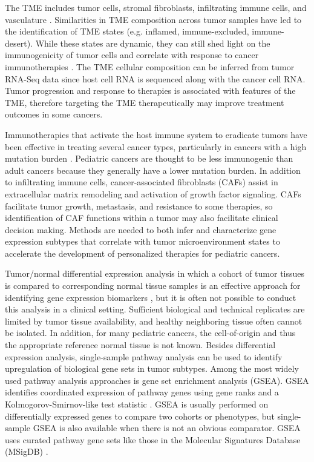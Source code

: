 \documentclass[10pt,letterpaper]{article}
\begin{document}
The TME includes tumor cells, stromal fibroblasts, infiltrating immune cells, and vasculature \cite{joyceCellExclusionImmune2015}. Similarities in TME composition across tumor samples have led to the identification of TME states (e.g. inflamed, immune-excluded, immune-desert). While these states are dynamic, they can still shed light on the immunogenicity of tumor cells and correlate with response to cancer immunotherapies \cite{chenElementsCancerImmunity2017}. The TME cellular composition can be inferred from tumor RNA-Seq data since host cell RNA is sequenced along with the cancer cell RNA. Tumor progression and response to therapies is associated with features of the TME, therefore targeting the TME therapeutically may improve treatment outcomes in some cancers. 

Immunotherapies that activate the host immune system to eradicate tumors have been effective in treating several cancer types, particularly in cancers with a high mutation burden \cite{mellmanCancerImmunotherapyComes2011, pageImmuneModulationCancer2014}. Pediatric cancers are thought to be less immunogenic than adult cancers because they generally have a lower mutation burden. In addition to infiltrating immune cells, cancer-associated fibroblasts (CAFs) assist in extracellular matrix remodeling and activation of growth factor signaling. CAFs facilitate tumor growth, metastasis, and resistance to some therapies, so identification of CAF functions within a tumor may also facilitate clinical decision making. Methods are needed to both infer and characterize gene expression subtypes that correlate with tumor microenvironment states to accelerate the development of personalized therapies for pediatric cancers. 

Tumor/normal differential expression analysis in which a cohort of tumor tissues is compared to corresponding normal tissue samples is an effective approach for identifying gene expression biomarkers \cite{andersCountbasedDifferentialExpression2013, andersDifferentialExpressionAnalysis2010, sonesonComparisonMethodsDifferential2013}, but it is often not possible to conduct this analysis in a clinical setting. Sufficient biological and technical replicates are limited by tumor tissue availability, and healthy neighboring tissue often cannot be isolated. In addition, for many pediatric cancers, the cell-of-origin and thus the appropriate reference normal tissue is not known. Besides differential expression analysis, single-sample pathway analysis can be used to identify upregulation of biological gene sets in tumor subtypes. Among the most widely used pathway analysis approaches is gene set enrichment analysis (GSEA). GSEA identifies coordinated expression of pathway genes using gene ranks and a Kolmogorov-Smirnov-like test statistic \cite{subramanianGeneSetEnrichment2005, moothaPGC1alpharesponsiveGenesInvolved2003}. GSEA is usually performed on differentially expressed genes to compare two cohorts or phenotypes, but single-sample GSEA is also available when there is not an obvious comparator. GSEA uses curated pathway gene sets like those in the Molecular Signatures Database (MSigDB) \cite{liberzonMolecularSignaturesDatabase2011}.
\end{document}

